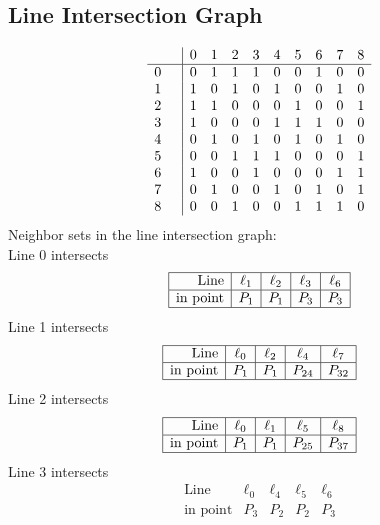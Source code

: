 \documentclass{article}
\begin{document}
{\subsection*{Line Intersection Graph}
{\arraycolsep=1pt
$$
\begin{array}{rr|*{9}r}
 &  & 0 & 1 & 2 & 3 & 4 & 5 & 6 & 7 & 8\\
\hline
0 &  & 0 & 1 & 1 & 1 & 0 & 0 & 1 & 0 & 0\\
1 &  & 1 & 0 & 1 & 0 & 1 & 0 & 0 & 1 & 0\\
2 &  & 1 & 1 & 0 & 0 & 0 & 1 & 0 & 0 & 1\\
3 &  & 1 & 0 & 0 & 0 & 1 & 1 & 1 & 0 & 0\\
4 &  & 0 & 1 & 0 & 1 & 0 & 1 & 0 & 1 & 0\\
5 &  & 0 & 0 & 1 & 1 & 1 & 0 & 0 & 0 & 1\\
6 &  & 1 & 0 & 0 & 1 & 0 & 0 & 0 & 1 & 1\\
7 &  & 0 & 1 & 0 & 0 & 1 & 0 & 1 & 0 & 1\\
8 &  & 0 & 0 & 1 & 0 & 0 & 1 & 1 & 1 & 0\\
\end{array}
$$
}%
Neighbor sets in the line intersection graph:\\
Line 0 intersects 
$$
\begin{array}{|r*{4}{|c}|}
\hline
\mbox{Line}  & \ell_{1} & \ell_{2} & \ell_{3} & \ell_{6}\\
\hline
\mbox{in point}  & P_{1} & P_{1} & P_{3} & P_{3}\\
\hline
\end{array}
$$
Line 1 intersects 
$$
\begin{array}{|r*{4}{|c}|}
\hline
\mbox{Line}  & \ell_{0} & \ell_{2} & \ell_{4} & \ell_{7}\\
\hline
\mbox{in point}  & P_{1} & P_{1} & P_{24} & P_{32}\\
\hline
\end{array}
$$
Line 2 intersects 
$$
\begin{array}{|r*{4}{|c}|}
\hline
\mbox{Line}  & \ell_{0} & \ell_{1} & \ell_{5} & \ell_{8}\\
\hline
\mbox{in point}  & P_{1} & P_{1} & P_{25} & P_{37}\\
\hline
\end{array}
$$
Line 3 intersects 
$$
\begin{array}{|r*{4}{|c}|}
\hline
\mbox{Line}  & \ell_{0} & \ell_{4} & \ell_{5} & \ell_{6}\\
\hline
\mbox{in point}  & P_{3} & P_{2} & P_{2} & P_{3}\\

\end{array}$$}
\end{document}
